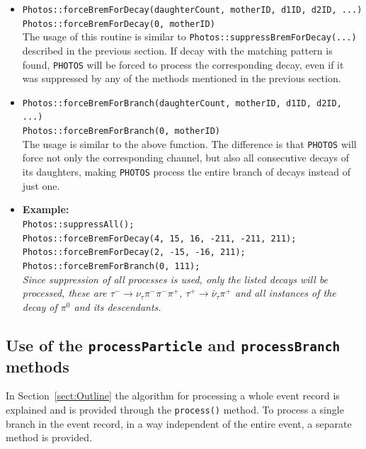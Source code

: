 \documentclass[]{Photos_interface_design}
\begin{document}
\begin{itemize}

 \item {\tt Photos::forceBremForDecay(daughterCount, motherID, d1ID, d2ID, ...)} \hfill \\
       {\tt Photos::forceBremForDecay(0, motherID)} \hfill \\
       The usage of this routine is similar to {\tt Photos::suppressBremForDecay(...)}
	   described in the previous section. If decay with the matching pattern is found,
	   {\tt PHOTOS} will be forced to process the corresponding decay, even if it was suppressed
	   by any of the methods mentioned in the previous section.
 \item {\tt Photos::forceBremForBranch(daughterCount, motherID, d1ID, d2ID, ...)} \hfill \\
       {\tt Photos::forceBremForBranch(0, motherID)} \hfill \\
       The usage is similar to the above function. The difference is
	   that {\tt PHOTOS} will force not only the corresponding channel,
	   but also all consecutive decays of its daughters, making {\tt PHOTOS} process the entire branch
	   of decays instead of just one.
 \item \textbf{Example:} \hfill \\
{\tt Photos::suppressAll(); } \\
{\tt Photos::forceBremForDecay(4, 15, 16, -211, -211, 211); } \\
{\tt Photos::forceBremForDecay(2, -15, -16, 211); } \\
{\tt Photos::forceBremForBranch(0, 111); } \\
\emph{Since suppression of all processes is used, only the listed decays will be processed,
      these are $\tau^- \rightarrow \nu_\tau \pi^- \pi^- \pi^+$, $\tau^+ \rightarrow \bar \nu_\tau \pi^+$
      and all instances of the decay of $\pi^0$ and its descendants.}
\end{itemize}

\subsection{Use of the {\tt processParticle} and {\tt processBranch} methods}
\label{PHOTOSgun}

In Section~\ref{sect:Outline} the algorithm for processing a whole
event record is explained and is provided through the {\tt process()}
method.  To process a single branch in the event record, in a way
independent of the entire event, a separate method is provided.
\end{document}
